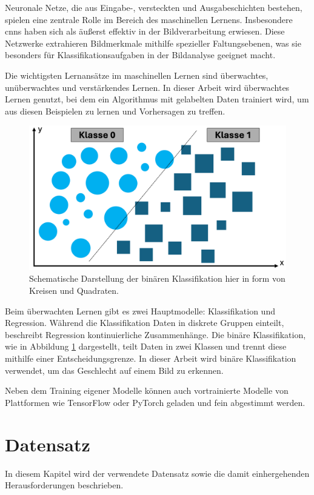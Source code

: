 \documentclass[journal,twoside,web]{ieeecolor}
\begin{document}
Neuronale Netze, die aus Eingabe-, versteckten und Ausgabeschichten bestehen, spielen eine zentrale Rolle im Bereich des maschinellen Lernens. Insbesondere \acp{cnn} haben sich als äußerst effektiv in der Bildverarbeitung erwiesen. Diese Netzwerke extrahieren Bildmerkmale mithilfe spezieller Faltungsebenen, was sie besonders für Klassifikationsaufgaben in der Bildanalyse geeignet macht.

Die wichtigsten Lernansätze im maschinellen Lernen sind überwachtes, unüberwachtes und verstärkendes Lernen. In dieser Arbeit wird überwachtes Lernen genutzt, bei dem ein Algorithmus mit gelabelten Daten trainiert wird, um aus diesen Beispielen zu lernen und Vorhersagen zu treffen.

\begin{figure}[H]
    \centerline{\includegraphics[width=\columnwidth]{binaere_klassifikation.png}}
    \caption{Schematische Darstellung der binären Klassifikation hier in form von Kreisen und Quadraten.}
    \label{fig:bin_class}
\end{figure}

Beim überwachten Lernen gibt es zwei Hauptmodelle: Klassifikation und Regression. Während die Klassifikation Daten in diskrete Gruppen einteilt, beschreibt Regression kontinuierliche Zusammenhänge. Die binäre Klassifikation, wie in Abbildung \ref{fig:bin_class} dargestellt, teilt Daten in zwei Klassen und trennt diese mithilfe einer Entscheidungsgrenze. In dieser Arbeit wird binäre Klassifikation verwendet, um das Geschlecht auf einem Bild zu erkennen.

Neben dem Training eigener Modelle können auch vortrainierte Modelle von Plattformen wie TensorFlow oder PyTorch geladen und fein abgestimmt werden.


\section{Datensatz} 
\label{sec:dataset}
In diesem Kapitel wird der verwendete Datensatz sowie die damit einhergehenden Herausforderungen beschrieben.
\end{document}
